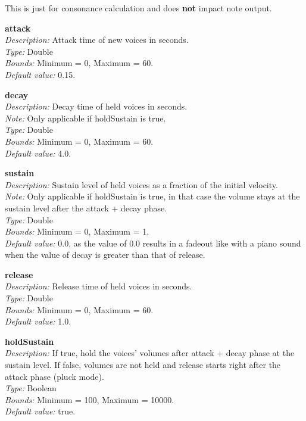 \documentclass[12pt,a4paper,titlepage,oneside]{report}
\begin{document}
This is just for consonance calculation and does \textbf{not} impact note output.

\noindent
\textbf{attack} \\
\emph{Description:} Attack time of new voices in seconds. \\
\emph{Type:} Double \\
\emph{Bounds:} Minimum = 0, Maximum = 60. \\
\emph{Default value:} 0.15.

\noindent
\textbf{decay} \\
\emph{Description:} Decay time of held voices in seconds. \\
\emph{Note:} Only applicable if holdSustain is true. \\
\emph{Type:} Double \\
\emph{Bounds:} Minimum = 0, Maximum = 60. \\
\emph{Default value:} 4.0.

\noindent
\textbf{sustain} \\
\emph{Description:} Sustain level of held voices as a fraction of the initial velocity. \\
\emph{Note:} Only applicable if holdSustain is true, in that case the volume stays at the sustain level after the attack + decay phase. \\
\emph{Type:} Double \\
\emph{Bounds:} Minimum = 0, Maximum = 1. \\
\emph{Default value:} 0.0,  as the value of 0.0 results in a fadeout like with a piano sound when the value of decay is greater than that of release.

\noindent
\textbf{release} \\
\emph{Description:} Release time of held voices in seconds. \\
\emph{Type:} Double \\
\emph{Bounds:} Minimum = 0, Maximum = 60. \\
\emph{Default value:} 1.0.

\noindent
\textbf{holdSustain} \\
\emph{Description:} If true, hold the voices' volumes after attack + decay phase at the sustain level. If false, volumes are not held and release starts right after the attack phase (pluck mode). \\
\emph{Type:} Boolean \\
\emph{Bounds:} Minimum = 100, Maximum = 10000. \\
\emph{Default value:} true.
\end{document}
